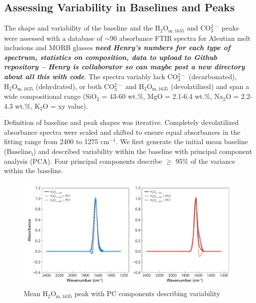 \documentclass[draft]{agujournal2019}
\begin{document}
\subsection{Assessing Variability in Baselines and Peaks}
The shape and variability of the baseline and the $\mathrm{H_2O_{m, 1635}}$ and CO$_{3}^{2-}$ peaks were assessed with a database of $\sim$90 absorbance FTIR spectra for Aleutian melt inclusions and MORB glasses \textbf{\textit{need Henry's numbers for each type of spectrum, statistics on composition, data to upload to Github repository -- Henry is collaborator so can maybe post a new directory about all this with code}}. The spectra variably lack CO$_{3}^{2-}$ (decarbonated), $\mathrm{H_2O_{m, 1635}}$ (dehydrated), or both CO$_{3}^{2-}$ and $\mathrm{H_2O_{m, 1635}}$ (devolatilized) and span a wide compositional range (SiO$_2$ = 43-60 wt.\%, MgO = 2.1-6.4 wt.\%, Na$_2$O = 2.2-4.3 wt.\%, K$_2$O = xy value). 

Definition of baseline and peak shapes was iterative. Completely devolatilized absorbance spectra were scaled and shifted to ensure equal absorbances in the fitting range from 2400 to 1275 cm$^{-1}$. We first generate the initial mean baseline ($\mathrm{\overline{Baseline}_i}$) and described variability within the baseline with principal component analysis (PCA). Four principal components describe $\ge$ 95\% of the variance within the baseline. 

\begin{figure}[htb!] 
\centering
\includegraphics[width=1.0\textwidth]{H2Om1635+PCVectors_Subplot}
\caption[Mean $\mathrm{H_2O_{m, 1635}}$ peak with PC components describing variability]{Mean $\mathrm{H_2O_{m, 1635}}$ peak with PC components describing variability}
\label{figure:H2OmwithPCA}
\end{figure}    
\end{document}
